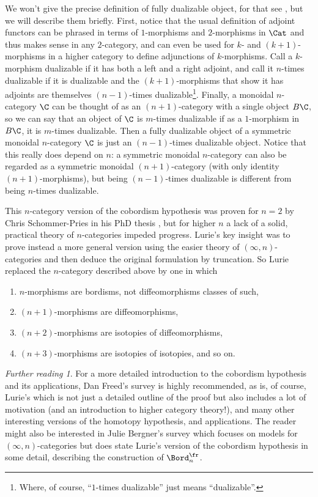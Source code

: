 \documentclass[12pt]{amsart}
\theoremstyle{definition} \newtheorem{definition}[theorem]{Definition}
\theoremstyle{remark} \newtheorem{remark}[theorem]{Remark}
\newtheorem*{further}{Further reading}
\numberwithin{equation}{section}
\newcommand{\oo}{\infty}
\begin{document}
We won't give the precise definition of fully dualizable object, for
that see \cite[Section 2.3]{LurieCob}, but we will describe them
briefly. First, notice that the usual definition of adjoint functors
can be phrased in terms of $1$-morphisms and $2$-morphisms in $\Cat$
and thus makes sense in any $2$-category, and can even be used for
$k$- and $(k+1)$-morphisms in a higher category to define adjunctions
of $k$-morphisms. Call a $k$-morphism dualizable if it has both a left
and a right adjoint, and call it $n$-times dualizable if it is
dualizable and the $(k+1)$-morphisms that show it has adjoints are
themselves $(n-1)$-times dualizable\footnote{Where, of course,
  ``$1$-times dualizable'' just means ``dualizable''.}. Finally, a
monoidal $n$-category $\C$ can be thought of as an $(n+1)$-category
with a single object $B\C$, so we can say that an object of $\C$ is
$m$-times dualizable if as a $1$-morphism in $B\C$, it is $m$-times
dualizable. Then a fully dualizable object of a symmetric monoidal
$n$-category $\C$ is just an $(n-1)$-times dualizable object. Notice
that this really does depend on $n$: a symmetric monoidal $n$-category
can also be regarded as a symmetric monoidal $(n+1)$-category (with
only identity $(n+1)$-morphisms), but being $(n-1)$-times dualizable
is different from being $n$-times dualizable.

This $n$-category version of the cobordism hypothesis was proven for
$n=2$ by Chris Schommer-Pries in his PhD thesis \cite{S-PTQFT}, but
for higher $n$ a lack of a solid, practical theory of $n$-categories
impeded progress. Lurie's key insight was to prove instead a more general
version using the easier theory of $(\oo,n)$-categories and then
deduce the original formulation by truncation. So Lurie replaced the
$n$-category described above by one in which
\begin{enumerate}
  \item $n$-morphisms are bordisms, not diffeomorphisms classes of such,
  \item $(n+1)$-morphisms are diffeomorphisms,
  \item $(n+2)$-morphisms are isotopies of diffeomorphisms,
  \item $(n+3)$-morphisms are isotopies of isotopies, and so on.
\end{enumerate}

\begin{further}
  For a more detailed introduction to the cobordism hypothesis and its
  applications, Dan Freed's survey \cite{Freed} is highly recommended,
  as is, of course, Lurie's \cite{LurieCob} which is not just a
  detailed outline of the proof but also includes a lot of motivation
  (and an introduction to higher category theory!), and many other
  interesting versions of the homotopy hypothesis, and applications.
  The reader might also be interested in Julie Bergner's survey
  \cite{BergnerCob} which focuses on models for $(\oo,n)$-categories
  but does state Lurie's version of the cobordism hypothesis in some
  detail, describing the construction of $\Bord^{\fr}_n$.
\end{further}

 {}
\end{document}
